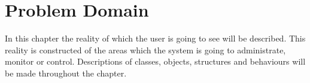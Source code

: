 \chapter{Problem Domain}
In this chapter the reality of which the user is going to see will be described. This reality is constructed of the areas which the system is going to administrate, monitor or control. Descriptions of classes, objects, structures and behaviours will be made throughout the chapter.



